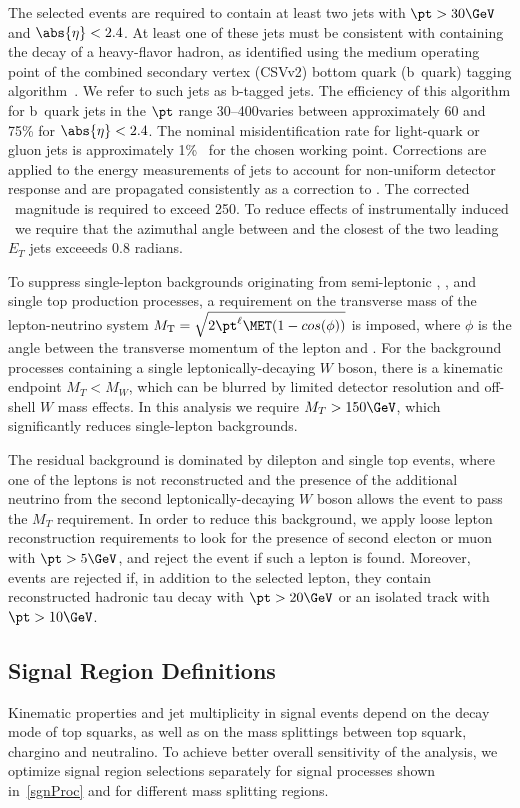 The selected events are required to contain at least two jets with $\pt > 30\GeV$ and $\abs{\eta} < 2.4$. At least one of these jets must 
be consistent with containing the decay of a heavy-flavor hadron, as identified using the medium operating point of the combined secondary 
vertex (CSVv2) bottom quark (b~quark) tagging algorithm~\cite{ref:btag}. We refer to such jets as b-tagged jets. The efficiency of this algorithm 
for b~quark jets in the $\pt$ range 30--400\GeV varies between approximately 60 and 75\% for $\abs{\eta} < 2.4$. The nominal misidentification 
rate for light-quark or gluon jets is approximately 1\%~\cite{ref:btag} for the chosen working point. Corrections are applied to the energy 
measurements of jets to account for non-uniform detector response and  are propagated consistently as a correction to \ptvecmiss. 
The corrected \MET\ magnitude is required to exceed 250\GeV. To reduce effects of instrumentally induced \MET\, we require that the
azimuthal angle between \ptvecmiss and the closest of the two leading $E_{T}$ jets exceeeds 0.8 radians.

To suppress single-lepton backgrounds originating from semi-leptonic \ttbar, 
\wjets, and single top production processes, a requirement on the transverse mass of the lepton-neutrino system
$\MT = \sqrt{2 \pt^{\ell} \MET (1 - cos(\phi))}$ is imposed, where $\phi$ is the angle between the transverse momentum of the lepton and \MET. 
For the background processes containing a single leptonically-decaying $W$ boson, there is a kinematic endpoint $M_{T} < M_{W}$, which can be 
blurred by limited detector resolution and off-shell $W$ mass effects. In this analysis we require $M_{T} > 150\GeV$, which significantly reduces 
single-lepton backgrounds. 

The residual background is dominated by dilepton \ttbar and single top events, where one of the leptons is not reconstructed and the 
presence of the additional neutrino from the second leptonically-decaying $W$ boson allows the event to pass the $M_{T}$ requirement.
In order to reduce this background, we apply loose lepton reconstruction requirements to look for the presence of second electon or muon
with $\pt > 5\GeV$, and reject the event if such a lepton is found. Moreover, events are rejected if, in addition to the selected lepton,
they contain reconstructed hadronic tau decay with $\pt > 20\GeV$ or an isolated track with $\pt > 10\GeV$.


\subsection{Signal Region Definitions}
\label{sec:presel}
Kinematic properties and jet multiplicity in signal events depend on the decay mode of top squarks, as well as on the 
mass splittings between top squark, chargino and neutralino. To achieve better overall sensitivity of the analysis, we optimize
signal region selections separately for signal processes shown in~\ref{sgnProc} and for different mass splitting regions.

